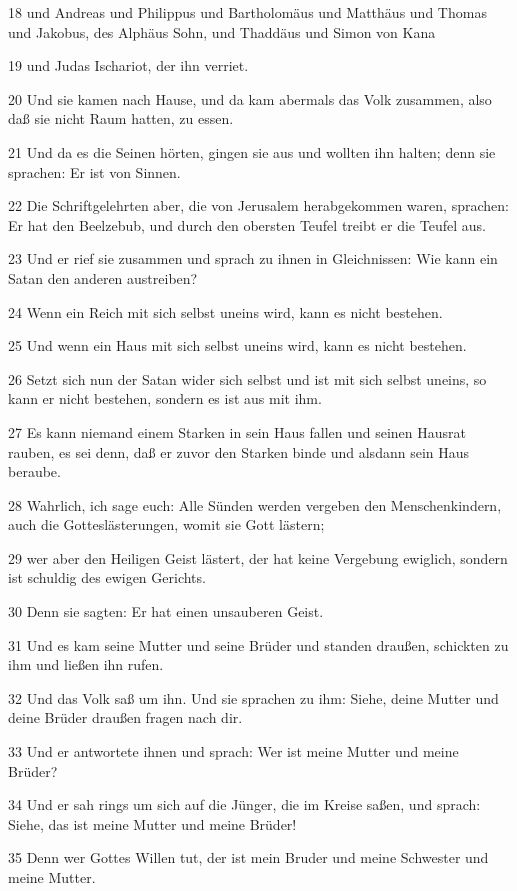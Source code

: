 \par 18 und Andreas und Philippus und Bartholomäus und Matthäus und Thomas und Jakobus, des Alphäus Sohn, und Thaddäus und Simon von Kana
\par 19 und Judas Ischariot, der ihn verriet.
\par 20 Und sie kamen nach Hause, und da kam abermals das Volk zusammen, also daß sie nicht Raum hatten, zu essen.
\par 21 Und da es die Seinen hörten, gingen sie aus und wollten ihn halten; denn sie sprachen: Er ist von Sinnen.
\par 22 Die Schriftgelehrten aber, die von Jerusalem herabgekommen waren, sprachen: Er hat den Beelzebub, und durch den obersten Teufel treibt er die Teufel aus.
\par 23 Und er rief sie zusammen und sprach zu ihnen in Gleichnissen: Wie kann ein Satan den anderen austreiben?
\par 24 Wenn ein Reich mit sich selbst uneins wird, kann es nicht bestehen.
\par 25 Und wenn ein Haus mit sich selbst uneins wird, kann es nicht bestehen.
\par 26 Setzt sich nun der Satan wider sich selbst und ist mit sich selbst uneins, so kann er nicht bestehen, sondern es ist aus mit ihm.
\par 27 Es kann niemand einem Starken in sein Haus fallen und seinen Hausrat rauben, es sei denn, daß er zuvor den Starken binde und alsdann sein Haus beraube.
\par 28 Wahrlich, ich sage euch: Alle Sünden werden vergeben den Menschenkindern, auch die Gotteslästerungen, womit sie Gott lästern;
\par 29 wer aber den Heiligen Geist lästert, der hat keine Vergebung ewiglich, sondern ist schuldig des ewigen Gerichts.
\par 30 Denn sie sagten: Er hat einen unsauberen Geist.
\par 31 Und es kam seine Mutter und seine Brüder und standen draußen, schickten zu ihm und ließen ihn rufen.
\par 32 Und das Volk saß um ihn. Und sie sprachen zu ihm: Siehe, deine Mutter und deine Brüder draußen fragen nach dir.
\par 33 Und er antwortete ihnen und sprach: Wer ist meine Mutter und meine Brüder?
\par 34 Und er sah rings um sich auf die Jünger, die im Kreise saßen, und sprach: Siehe, das ist meine Mutter und meine Brüder!
\par 35 Denn wer Gottes Willen tut, der ist mein Bruder und meine Schwester und meine Mutter.

